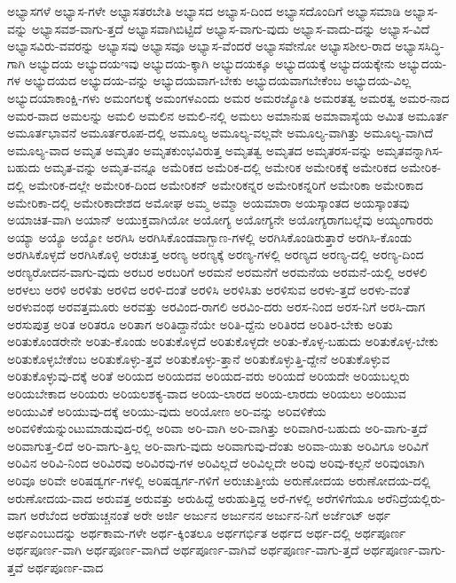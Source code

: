 {ಅಭ್ಯಾಸಗಳೆ
ಅಭ್ಯಾಸ-ಗಳೇ
ಅಭ್ಯಾಸತರಬೇತಿ
ಅಭ್ಯಾಸದ
ಅಭ್ಯಾಸ-ದಿಂದ
ಅಭ್ಯಾಸದೊಂದಿಗೆ
ಅಭ್ಯಾಸಮಾಡಿ
ಅಭ್ಯಾಸ-ವನ್ನು
ಅಭ್ಯಾಸವಶ-ವಾಗು-ತ್ತದೆ
ಅಭ್ಯಾಸವಾಗಿಬಿಟ್ಟಿದೆ
ಅಭ್ಯಾಸ-ವಾಗು-ವುದು
ಅಭ್ಯಾಸ-ವಾದು-ದನ್ನು
ಅಭ್ಯಾಸ-ವಿದೆ
ಅಭ್ಯಾಸವಿರು-ವವರನ್ನು
ಅಭ್ಯಾಸವು
ಅಭ್ಯಾಸವೂ
ಅಭ್ಯಾಸ-ವೆಂದರೆ
ಅಭ್ಯಾಸವೇನೋ
ಅಭ್ಯಾಸಶೀಲ-ರಾದ
ಅಭ್ಯಾಸಸಿದ್ಧಿ-ಗಾಗಿ
ಅಭ್ಯುದಯ
ಅಭ್ಯುದಯಇವು
ಅಭ್ಯುದಯ-ಕ್ಕಾಗಿ
ಅಭ್ಯುದಯಕ್ಕೂ
ಅಭ್ಯುದಯಕ್ಕೆ
ಅಭ್ಯುದಯಕ್ಕೇನು
ಅಭ್ಯುದಯ-ಗಳ
ಅಭ್ಯುದಯದ
ಅಭ್ಯುದಯ-ವನ್ನು
ಅಭ್ಯುದಯವಾಗ-ಬೇಕು
ಅಭ್ಯುದಯವಾಗಬೇಕೆಂಬ
ಅಭ್ಯುದಯ-ವಿಲ್ಲ
ಅಭ್ಯುದಯಾಕಾಂಕ್ಷಿ-ಗಳು
ಅಮಂಗಲಕ್ಕೆ
ಅಮಂಗಳಎಂದು
ಅಮರ
ಅಮರಜ್ಯೋತಿ
ಅಮರತತ್ವ
ಅಮರತ್ವ
ಅಮರ-ನಾದ
ಅಮರ-ವಾದ
ಅಮಲನ್ನು
ಅಮಲಿ
ಅಮಲಿನ
ಅಮಲಿ-ನಲ್ಲಿ
ಅಮಲು
ಅಮಾನುಷ
ಅಮಾವಾಸ್ಯೆಯ
ಅಮಿತ
ಅಮೂರ್ತ
ಅಮೂರ್ತಭಾವನೆ
ಅಮೂರ್ತರೂಪ-ದಲ್ಲಿ
ಅಮೂಲ್ಯ
ಅಮೂಲ್ಯ-ವಲ್ಲವೇ
ಅಮೂಲ್ಯ-ವಾಗಿತ್ತು
ಅಮೂಲ್ಯ-ವಾಗಿದೆ
ಅಮೂಲ್ಯ-ವಾದ
ಅಮೃತ
ಅಮೃತಂ
ಅಮೃತಕುಂಭವಿರುತ್ತ
ಅಮೃತತ್ವ
ಅಮೃತದ
ಅಮೃತರಸ-ವನ್ನು
ಅಮೃತವನ್ನಾಗಿಸ-ಬಹುದು
ಅಮೃತ-ವನ್ನು
ಅಮೃತ-ವನ್ನೂ
ಅಮೆರಿಕದ
ಅಮೆರಿಕ-ದಲ್ಲಿ
ಅಮೇರಿಕ
ಅಮೇರಿಕಕ್ಕೆ
ಅಮೇರಿಕದ
ಅಮೇರಿಕ-ದಲ್ಲಿ
ಅಮೇರಿಕ-ದಲ್ಲೇ
ಅಮೇರಿಕ-ದಿಂದ
ಅಮೇರಿಕನ್
ಅಮೇರಿಕನ್ನರ
ಅಮೇರಿಕನ್ನರಿಗೆ
ಅಮೇರಿಕಾ
ಅಮೇರಿಕಾದ
ಅಮೇರಿಕಾ-ದಲ್ಲಿ
ಅಮೇರಿಕಾದೇಶದ
ಅಮೋಘ
ಅಮ್ಮ
ಅಮ್ಮಾ
ಅಯಮಾರಾ
ಅಯಸ್ಕಾಂತದ
ಅಯಸ್ಕಾಂತವು
ಅಯಾಚಿತ-ವಾಗಿ
ಅಯಾನ್
ಅಯುಕ್ತವಾಗಿಯೋ
ಅಯೋಗ್ಯ
ಅಯೋಗ್ಯನೇ
ಅಯೋಗ್ಯರಾಗಬಲ್ಲೆವು
ಅಯ್ಯಂಗಾರರು
ಅಯ್ಯಾ
ಅಯ್ಯೊ
ಅಯ್ಯೋ
ಅರಗಿಸಿ
ಅರಗಿಸಿಕೊಂಡವಾಗ್ಬಾಣ-ಗಳಲ್ಲಿ
ಅರಗಿಸಿಕೊಂಡಿರುತ್ತಾರೆ
ಅರಗಿಸಿ-ಕೊಂಡು
ಅರಗಿಸಿಕೊಳ್ಳದೆ
ಅರಗಿಸಿಕೊಳ್ಳಿ
ಅರಚುತ್ತ
ಅರಣ್ಯ
ಅರಣ್ಯಕ್ಕೆ
ಅರಣ್ಯ-ಗಳಲ್ಲಿ
ಅರಣ್ಯದ
ಅರಣ್ಯ-ದಲ್ಲಿ
ಅರಣ್ಯ-ದಿಂದ
ಅರಣ್ಯರೋದನ-ವಾಗು-ವುದು
ಅರಬರ
ಅರಬರಿಗೆ
ಅರಮನೆ
ಅರಮನೆಗೆ
ಅರಮನೆಯ
ಅರಮನೆ-ಯಲ್ಲಿ
ಅರಳಲಿ
ಅರಳಲು
ಅರಳಿ
ಅರಳಿತು
ಅರಳಿದ
ಅರಳಿ-ದಂತೆ
ಅರಳಿಸಿ
ಅರಳಿಸಿತು
ಅರಳಿಸುವ
ಅರಳು-ತ್ತದೆ
ಅರಳು-ವಂತೆ
ಅರಳುವಂಥ
ಅರವತ್ತಮೂರು
ಅರವತ್ತು
ಅರವಿಂದ-ರಾಗಲಿ
ಅರವಿಂ-ದರು
ಅರಸ-ನಿಂದ
ಅರಸ-ನಿಗೆ
ಅರಸಿ-ದಾಗ
ಅರಸುಪುತ್ರ
ಅರಿತ
ಅರಿತರೂ
ಅರಿತಾಗ
ಅರಿತಿದ್ದಾನೆಯೇ
ಅರಿತಿ-ದ್ದೆನು
ಅರಿತಿರದ
ಅರಿತಿರ-ಬೇಕು
ಅರಿತು
ಅರಿತುಕೊಂಡರೇನೇ
ಅರಿತು-ಕೊಂಡು
ಅರಿತುಕೊಳ್ಳದೆ
ಅರಿತುಕೊಳ್ಳದೇ
ಅರಿತು-ಕೊಳ್ಳ-ಬಹುದು
ಅರಿತುಕೊಳ್ಳ-ಬೇಕು
ಅರಿತುಕೊಳ್ಳಬೇಕೆಂಬ
ಅರಿತುಕೊಳ್ಳು-ತ್ತವೆ
ಅರಿತುಕೊಳ್ಳು-ತ್ತಾನೆ
ಅರಿತುಕೊಳ್ಳುತ್ತಿ-ದ್ದೇನೆ
ಅರಿತುಕೊಳ್ಳುವ
ಅರಿತುಕೊಳ್ಳುವು-ದಕ್ಕೆ
ಅರಿತೆ
ಅರಿಯದ
ಅರಿಯದವ
ಅರಿಯದ-ವರು
ಅರಿಯದೆ
ಅರಿಯದೇ
ಅರಿಯಬಲ್ಲರು
ಅರಿಯಬೇಕಾದ
ಅರಿಯರು
ಅರಿಯಲಶಕ್ಯ-ವಾದ
ಅರಿಯ-ಲಾರದ
ಅರಿಯ-ಲಾರದು
ಅರಿಯಲು
ಅರಿಯುವ
ಅರಿಯುವಿಕೆ
ಅರಿಯುವು-ದಕ್ಕೆ
ಅರಿಯು-ವುದು
ಅರಿಯೋಣ
ಅರಿ-ವನ್ನು
ಅರಿವಳಿಕೆಯ
ಅರಿವಳಿಕೆಯನ್ನುಂಟುಮಾಡುವುದ-ರಲ್ಲಿ
ಅರಿವಾ
ಅರಿ-ವಾಗಿ
ಅರಿ-ವಾಗಿತ್ತು
ಅರಿವಾಗಿರ-ಬಹುದು
ಅರಿ-ವಾಗು-ತ್ತದೆ
ಅರಿವಾಗುತ್ತ-ಲಿದೆ
ಅರಿ-ವಾಗು-ತ್ತಿಲ್ಲ
ಅರಿ-ವಾಗು-ವುದು
ಅರಿವಾಗುವು-ದೆಂತು
ಅರಿವಾ-ಯಿತು
ಅರಿವಿಗೂ
ಅರಿವಿಗೆ
ಅರಿವಿನ
ಅರಿವಿ-ನಿಂದ
ಅರಿವಿರವು
ಅರಿವಿರವು-ಗಳ
ಅರಿವಿಲ್ಲದೆ
ಅರಿವಿಲ್ಲದೇ
ಅರಿವು
ಅರಿವು-ಕಲ್ಪನೆ
ಅರಿವುಂಟಾಗಿ
ಅರಿವೂ
ಅರಿವೇ
ಅರಿಷಡ್ವರ್ಗ-ಗಳಲ್ಲಿ
ಅರಿಷಡ್ವರ್ಗ-ಗಳಿಗೆ
ಅರುಚುತ್ತೀಯೆ
ಅರುಣೋದಯ
ಅರುಣೋದಯ-ದಲ್ಲಿ
ಅರುಣೋದಯ-ವಾದ
ಅರುವತ್ತ
ಅರುವತ್ತು
ಅರುಹಿದ್ದೆ
ಅರುಹುತ್ತಿದ್ದ
ಅರೆ-ಗಳಲ್ಲಿ
ಅರೆಗಳಿಗೆಯೂ
ಅರೆನಿದ್ರೆಯಲ್ಲಿರು-ವಾಗ
ಅರೆಬೆಂದ
ಅರೆಹುಚ್ಚನಂತೆ
ಅರೇ
ಅರ್ಜಿ
ಅರ್ಜುನ
ಅರ್ಜುನನ
ಅರ್ಜುನ-ನಿಗೆ
ಅರ್ಜೆಂಟ್
ಅರ್ಥ
ಅರ್ಥಎಂಬುದನ್ನು
ಅರ್ಥಕಾಮ-ಗಳೇ
ಅರ್ಥ-ಕ್ಕಿಂತಲೂ
ಅರ್ಥಗರ್ಭಿತ
ಅರ್ಥದ
ಅರ್ಥ-ದಲ್ಲಿ
ಅರ್ಥಪೂರ್ಣ
ಅರ್ಥಪೂರ್ಣ-ವಾಗಿ
ಅರ್ಥಪೂರ್ಣ-ವಾಗಿದೆ
ಅರ್ಥಪೂರ್ಣ-ವಾಗಿವೆ
ಅರ್ಥಪೂರ್ಣ-ವಾಗು-ತ್ತದೆ
ಅರ್ಥಪೂರ್ಣ-ವಾಗು-ತ್ತವೆ
ಅರ್ಥಪೂರ್ಣ-ವಾದ
}
